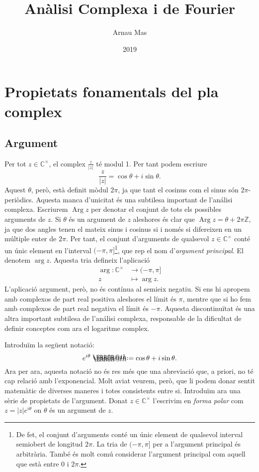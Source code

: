 \documentclass[12pt,twoside]{report}
\title{Anàlisi Complexa i de Fourier}
\author{Arnau Mas}
\date{2019}
\makeatletter
\numberwithin{table}{section}
\numberwithin{equation}{section}
\numberwithin{figure}{section}
\newcommand{\Z}{\ensuremath{\mathbb{Z}}}
\newcommand{\Cu}{\ensuremath{\mathbb{C}^\times}}
\newcommand{\abs}[1]{\left\lvert #1 \right\rvert}
\DeclareMathOperator{\Arg}{Arg}
\newcommand*{\defeq}{\mathrel{\rlap{%
    \raisebox{0.3ex}{$\m@th\cdot$}}%
  \raisebox{-0.3ex}{$\m@th\cdot$}}%
	=
}
\makeatother
\begin{document}
\maketitle

\chapter{Propietats fonamentals del pla complex}

\section{Argument}
Per tot \( z \in \Cu \), el complex \( \frac{z}{\abs{z}} \) té modul 1. Per tant podem escriure
\begin{equation*}
	\frac{z}{\abs{z}} = \cos{\theta} + i \sin{\theta}.
\end{equation*}
Aquest \( \theta \), però, està definit mòdul \( 2\pi \), ja que tant el cosinus com el sinus són \( 2\pi \)-periòdics. Aquesta manca d'unicitat és una subtilesa important de l'análisi complexa. Escriurem \( \Arg z \) per denotar el conjunt de tots els possibles arguments de \( z \). Si \( \theta \) és un argument de \( z \) aleshores és clar que \( \Arg z = \theta + 2\pi\Z \), ja que dos angles tenen el mateix sinus i cosinus si i només si difereixen en un múltiple enter de \( 2\pi \). Per tant, el conjunt d'arguments de qualsevol \( z \in \Cu \) conté un únic element en l'interval \( (-\pi, \pi] \)\footnote{De fet, el conjunt d'arguments conté un únic element de qualsevol interval semiobert de longitud \( 2\pi \). La tria de \( (-\pi, \pi] \) per a l'argument principal és arbitrària. També és molt comú considerar l'argument principal com aquell que està entre 0 i \( 2\pi \).}, que rep el nom d'\emph{argument principal}. El denotem \( \arg z \). Aquesta tria defineix l'aplicació
\begin{align*}
	\arg \colon \Cu & \longrightarrow (-\pi, \pi] \\
	z & \longmapsto \arg{z}.
\end{align*}
L'aplicació argument, però, no és contínua al semieix negatiu. Si ens hi apropem amb complexos de part real positiva aleshores el límit és \( \pi \), mentre que si ho fem amb complexos de part real negativa el límit és \( -\pi \). Aquesta discontinuïtat és una altra important subtilesa de l'análisi complexa, responsable de la dificultat de definir conceptes com ara el logaritme complex. 

 

Introduïm la següent notació:
\begin{equation*}
	e^{i\theta} \defeq \cos{\theta} + i\sin{\theta}.
\end{equation*}
Ara per ara, aquesta notació no és res més que una abreviació que, a priori, no té cap relació amb l'exponencial. Molt aviat veurem, però, que li podem donar sentit matemàtic de diverses maneres i totes consistents entre si. Introduïm ara una sèrie de propietats de l'argument. Donat \( z \in \Cu \) l'escrivim en \emph{forma polar} com \( z = \abs{z}e^{i\theta} \) on \( \theta \) és un argument de \( z \).
\end{document}

